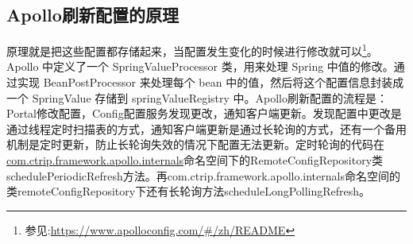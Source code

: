 \documentclass[../../../interview-questions.tex]{subfiles}
\begin{document}
\subsection{Apollo刷新配置的原理}

原理就是把这些配置都存储起来，当配置发生变化的时候进行修改就可以\footnote{参见:\url{https://www.apolloconfig.com/\#/zh/README}}。Apollo 中定义了一个 SpringValueProcessor 类，用来处理 Spring 中值的修改。通过实现 BeanPostProcessor 来处理每个 bean 中的值，然后将这个配置信息封装成一个 SpringValue 存储到 springValueRegistry 中。Apollo刷新配置的流程是：Portal修改配置，Config配置服务发现更改，通知客户端更新。发现配置中更改是通过线程定时扫描表的方式，通知客户端更新是通过长轮询的方式，还有一个备用机制是定时更新，防止长轮询失效的情况下配置无法更新。定时轮询的代码在\url{com.ctrip.framework.apollo.internals}命名空间下的RemoteConfigRepository类schedulePeriodicRefresh方法。再com.ctrip.framework.apollo.internals命名空间的类remoteConfigRepository下还有长轮询方法scheduleLongPollingRefresh。
\end{document}
